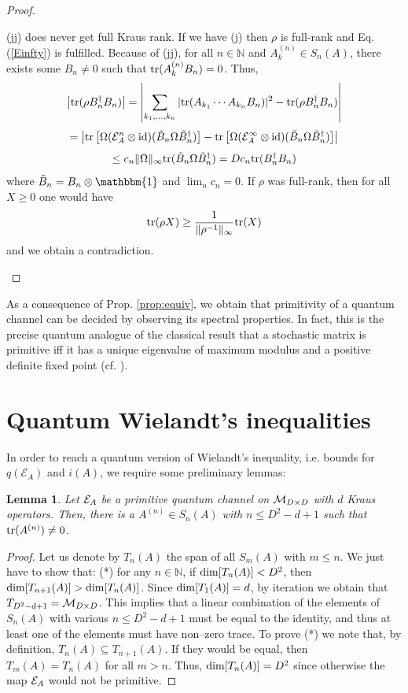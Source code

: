 \documentclass[journal,twoside]{IEEEtran}
\newtheorem{lemma}{Lemma}
\newcommand{\1}{\mathbbm{1}}
\def\id{{\rm id}}
\def\E{{\cal E}}
\renewcommand{\>}{\rangle}
\newcommand{\<}{\langle}
\def\E{\mathcal{E}}
\def\1{\mathbbm{1}}
\def\MDD{{\cal M}_{D\times D}}
\def\N{\mathbb N}
\begin{document}
\begin{proof}
\begin{trivlist}
(jj) does never get full Kraus rank. If we have (j) then $\rho$ is
full-rank and Eq. (\ref{Einfty}) is fulfilled. Because of (jj), for
all $n\in \N$ and $A^{(n)}_k\in S_n(A)$, there exists some $B_n\ne
0$ such that ${\rm tr}(A^{(n)}_k B_n)=0$. Thus,
 $$
 \left|{\rm tr}(\rho B_n^\dagger B_n)\right|=
 \left|\sum_{k_1,\ldots, k_n} |{\rm tr}(A_{k_1}\cdots A_{k_n} B_n)|^2 - {\rm tr}(\rho B_n^\dagger B_n)\right|$$
 $$=
 \left|{\rm tr}\left[\Omega({\cal E}_A^n\otimes \id)
 (\tilde{B}_n\Omega \tilde{B}_n^\dagger)\right]-{\rm tr}\left[\Omega({\cal E}_A^\infty\otimes \id)
 (\tilde{B}_n\Omega \tilde{B}_n^\dagger)\right]\right|$$
 $$\le c_n\|\Omega\|_\infty {\rm tr}(\tilde{B}_n\Omega \tilde{B}_n^\dagger)=
 D c_n {\rm tr}(B_n^\dagger B_n)
 $$
where $\tilde{B}_n=B_n\otimes\1$ and $\lim_nc_n=0$. If $\rho$ was
full-rank, then for all $X\ge 0$ one would have
$${\rm tr}(\rho X)\ge\frac{1}{\|\rho^{-1}\|_\infty} {\rm tr}(X)$$ and we obtain a contradiction.
\end{trivlist}
\end{proof}

As a consequence of Prop. \ref{prop:equiv}, we obtain that
primitivity of a quantum channel can be decided by observing its
spectral properties. In fact, this  is the precise quantum analogue
of the classical result that a stochastic matrix is primitive iff it
has a unique eigenvalue of maximum modulus and a  positive definite
fixed point (cf. \cite{Horn}).


\section{Quantum Wielandt's inequalities}

In order to reach a quantum version of Wielandt's inequality, i.e.
bounds for $q(\E_A)$ and $i(A)$, we require some preliminary lemmas:

\begin{lemma}
\label{lemma1} Let ${\cal E}_A$ be a primitive quantum channel on
$\MDD$ with $d$ Kraus operators. Then, there is a $A^{(n)}\in
S_n(A)$ with $n\le D^2-d+1$ such that ${\rm tr}(A^{(n)})\ne 0$.
\end{lemma}

\begin{proof}
Let us denote by $T_n(A)$ the span of all $S_m(A)$ with $m\le n$. We
just have to show that: (*) for any $n\in \N$, if ${\rm
dim}[T_n(A)]<D^2$, then ${\rm dim}[T_{n+1}(A)]>{\rm dim}[T_{n}(A)]$.
Since ${\rm dim}[T_1(A)]=d$, by iteration we obtain that $T_{D^2 - d
+ 1} = \MDD$. This implies that a linear combination of the elements
of $S_n(A)$ with various $n\le D^2-d+1$ must be equal to the
identity, and thus at least one of the elements must have non--zero
trace. To prove (*) we note that, by definition, $T_{n}(A)\subseteq
T_{n+1}(A)$. If they would be equal, then $T_{m}(A)= T_{n}(A)$ for
all $m>n$. Thus, ${\rm dim}[T_n(A)]=D^2$ since otherwise the map
${\cal E}_A$ would not be primitive.
\end{proof}
\end{document}
